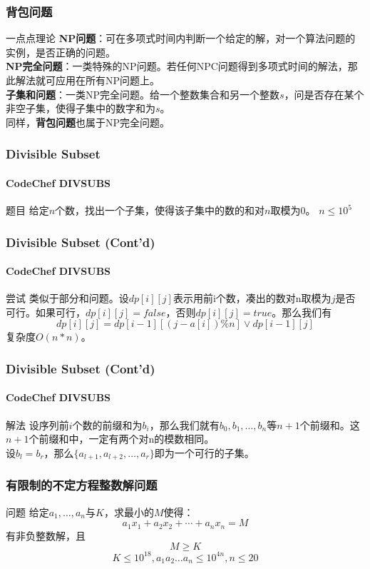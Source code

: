 \documentclass[hyperref={unicode=true}]{beamer}
\begin{document}
\begin{frame}\frametitle{背包问题}
  \begin{block}{一点点理论}
    {\bf NP问题}：可在多项式时间内判断一个给定的解，对一个算法问题的实例，是否正确的问题。\\
    {\bf NP完全问题}：一类特殊的NP问题。若任何NPC问题得到多项式时间的解法，那此解法就可应用在所有NP问题上。\\
    {\bf 子集和问题}：一类NP完全问题。给一个整数集合和另一个整数$s$，问是否存在某个非空子集，使得子集中的数字和为$s$。\\
    同样，{\bf 背包问题}也属于NP完全问题。
  \end{block}
\end{frame}
\begin{frame}\frametitle{Divisible Subset}
  \framesubtitle{CodeChef DIVSUBS}
  \begin{block}{题目}
    给定$n$个数，找出一个子集，使得该子集中的数的和对$n$取模为$0$。
    $n\leq 10^5$
  \end{block}
\end{frame}
\begin{frame}\frametitle{Divisible Subset (Cont'd)}
  \framesubtitle{CodeChef DIVSUBS}
  \begin{alertblock}{尝试}
    类似于部分和问题。设$dp[i][j]$表示用前i个数，凑出的数对n取模为$j$是否可行。如果可行，$dp[i][j]=false$，否则$dp[i][j]=true$。那么我们有
    \[dp[i][j] = dp[i-1][(j-a[i])\%n] \vee dp[i-1][j]\]
    复杂度$O(n*n)$。
  \end{alertblock}
\end{frame}
\begin{frame}\frametitle{Divisible Subset (Cont'd)}
  \framesubtitle{CodeChef DIVSUBS}
  \begin{exampleblock}{解法}
    设序列前$i$个数的前缀和为$b_i$，那么我们就有$b_0,b_1,\ldots,b_n$等$n+1$个前缀和。这$n+1$个前缀和中，一定有两个对n的模数相同。\\
    设$b_l=b_r$，那么$\{a_{l+1},a_{l+2},\ldots,a_r\}$即为一个可行的子集。
  \end{exampleblock}
\end{frame}
\begin{frame}\frametitle{有限制的不定方程整数解问题}
  \begin{block}{问题}
    给定$a_1,\ldots,a_n$与$K$，求最小的$M$使得：
    \[a_1x_1+a_2x_2+ \cdots + a_n x_n=M\]有非负整数解，且
    \[M \ge K\]
    \[K\leq 10^{18},a_1a_2\ldots a_n\leq 10^{4n},n\leq 20\]
  \end{block}
\end{frame}
\end{document}
